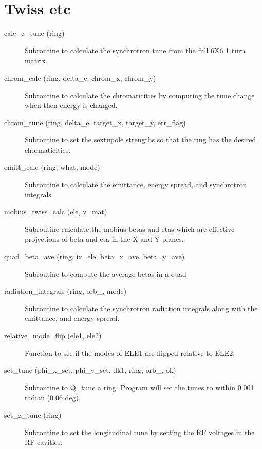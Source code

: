 \section{Twiss etc}
\label{r:twiss}

\begin{description}

\item[calc\_z\_tune (ring)] \Newline
Subroutine to calculate the synchrotron tune from the full 6X6 1 turn matrix. 

\item[chrom\_calc (ring, delta\_e, chrom\_x, chrom\_y)] \Newline
Subroutine to calculate the chromaticities by computing the tune change when then energy is changed. 

\item[chrom\_tune (ring, delta\_e, target\_x, target\_y, err\_flag)] \Newline
Subroutine to set the sextupole strengths so that the ring has the desired chormaticities. 

\item[emitt\_calc (ring, what, mode)] \Newline
Subroutine to calculate the emittance, energy spread, and synchrotron integrals. 

\item[mobius\_twiss\_calc (ele, v\_mat)] \Newline
Subroutine calculate the mobius betas and etas which are effective projections of beta and eta in the X and Y planes. 

\item[quad\_beta\_ave (ring, ix\_ele, beta\_x\_ave, beta\_y\_ave)] \Newline
Subroutine to compute the average betas in a quad 

\item[radiation\_integrals (ring, orb\_, mode)] \Newline
Subroutine to calculate the synchrotron radiation integrals along with the emittance, and energy spread. 

\item[relative\_mode\_flip (ele1, ele2)] \Newline
Function to see if the modes of ELE1 are flipped relative to ELE2. 

\item[set\_tune (phi\_x\_set, phi\_y\_set, dk1, ring, orb\_, ok)] \Newline
Subroutine to Q\_tune a ring. Program will set the tunes to within 0.001 radian (0.06 deg). 

\item[set\_z\_tune (ring)] \Newline
Subroutine to set the longitudinal tune by setting the RF voltages in the RF cavities. 


\end{description}
